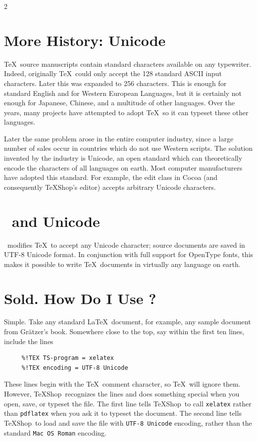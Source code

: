 \documentclass[11pt, oneside]{amsart}
\newcommand{\TS}{TeXShop}
\begin{document}
\begin{multicols}{2}
\section{More History: Unicode}

\TeX\ source manuscripts contain standard characters available on any typewriter. Indeed, originally \TeX\ could only accept the 128 standard ASCII input characters. Later this was expanded to 256 characters. This is enough for standard English and for Western European Languages, but it is certainly not enough for Japanese, Chinese, and a multitude of other languages. Over the years, many projects have attempted to adopt \TeX\ so it can typeset these other languages.

Later the same problem arose in the entire computer industry, since a large number of sales occur in countries which do not use Western scripts. The solution invented by the industry is Unicode, an open standard which can theoretically encode the characters of all languages on earth. Most computer manufacturers have adopted this standard. For example, the edit class in Cocoa (and consequently \TS's editor) accepts arbitrary Unicode characters.

\section{\XeLaTeX\ and Unicode}

\XeLaTeX\ modifies \TeX\ to accept any Unicode character; source documents are saved in UTF-8 Unicode format. In conjunction with full support for OpenType fonts, this makes it possible to write \TeX\ documents in virtually any language on earth.

\section{Sold. How Do I Use \XeLaTeX?}

Simple. Take any standard \LaTeX\ document, for example, any sample document from Gr\"atzer's book. Somewhere close to the top, say within the first ten lines, include the lines
\begin{verbatim}
     %!TEX TS-program = xelatex
     %!TEX encoding = UTF-8 Unicode
\end{verbatim}
These lines begin with the \TeX\ comment character, so \TeX\ will ignore them. However, \TS\ recognizes the lines and does something special when you open, save, or typeset the file. The first line tells \TS\ to call {\tt xelatex} rather than {\tt pdflatex} when you ask it to typeset the document. The second line tells \TS\ to load and save the file with {\tt UTF-8 Unicode} encoding, rather than the standard {\tt Mac OS Roman} encoding.


\end{multicols}
\end{document}
